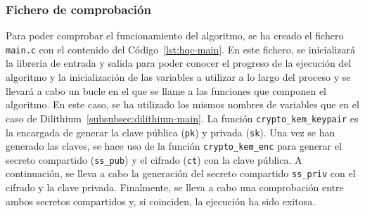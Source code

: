 \subsubsection{Fichero de comprobación}\label{subsubsec:hqc-main}

Para poder comprobar el funcionamiento del algoritmo, se ha creado el fichero \texttt{main.c} con el contenido del Código~\ref{lst:hqc-main}.
En este fichero, se inicializará la librería de entrada y salida para poder conocer el progreso de la ejecución del algoritmo y la inicialización de las variables a utilizar a lo largo del proceso y se llevará a cabo un bucle en el que se llame a las funciones que componen el algoritmo.
En este caso, se ha utilizado los mismos nombres de variables que en el caso de Dilithium~\ref{subsubsec:dilithium-main}.
La función \texttt{crypto\_kem\_keypair} es la encargada de generar la clave pública (\texttt{pk}) y privada (\texttt{sk}).
Una vez se han generado las claves, se hace uso de la función \texttt{crypto\_kem\_enc} para generar el secreto compartido (\texttt{ss\_pub}) y el cifrado (\texttt{ct}) con la clave pública.
A continuación, se lleva a cabo la generación del secreto compartido \texttt{ss\_priv} con el cifrado y la clave privada.
Finalmente, se lleva a cabo una comprobación entre ambos secretos compartidos y, si coinciden, la ejecución ha sido exitosa.

